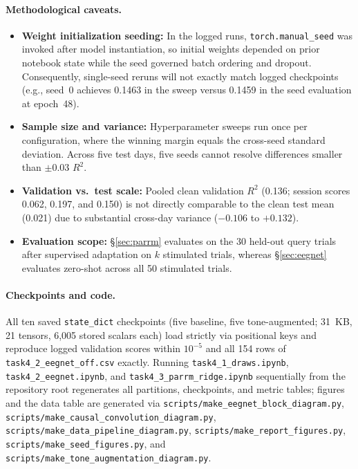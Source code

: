 \documentclass{article}
\begin{document}
\paragraph{Methodological caveats.}
\begin{itemize}\itemsep2pt
\item \textbf{Weight initialization seeding:} In the logged runs, \texttt{torch.manual\_seed} was invoked after model instantiation, so initial weights depended on prior notebook state while the seed governed batch ordering and dropout. Consequently, single-seed reruns will not exactly match logged checkpoints (e.g., seed~0 achieves 0.1463 in the sweep versus 0.1459 in the seed evaluation at epoch~48).
\item \textbf{Sample size and variance:} Hyperparameter sweeps run once per configuration, where the winning margin equals the cross-seed standard deviation. Across five test days, five seeds cannot resolve differences smaller than $\pm 0.03$ $R^2$.
\item \textbf{Validation vs.\ test scale:} Pooled clean validation $R^2$ (0.136; session scores 0.062, 0.197, and 0.150) is not directly comparable to the clean test mean (0.021) due to substantial cross-day variance ($-0.106$ to $+0.132$).
\item \textbf{Evaluation scope:} \S\ref{sec:parrm} evaluates on the 30 held-out query trials after supervised adaptation on $k$ stimulated trials, whereas \S\ref{sec:eegnet} evaluates zero-shot across all 50 stimulated trials.
\end{itemize}

\begingroup
\raggedright
\paragraph{Checkpoints and code.}
All ten saved \texttt{state\_dict} checkpoints (five baseline, five tone-augmented; 31~KB, 21 tensors, 6{,}005 stored scalars each) load strictly via positional keys and reproduce logged validation scores within $10^{-5}$ and all 154 rows of \texttt{task4\_2\_eegnet\_off.csv} exactly. Running \texttt{task4\_1\_draws.ipynb}, \texttt{task4\_2\_eegnet.ipynb}, and \texttt{task4\_3\_parrm\_ridge.ipynb} sequentially from the repository root regenerates all partitions, checkpoints, and metric tables; figures and the data table are generated via \texttt{scripts/make\_eegnet\_block\_diagram.py}, \texttt{scripts/make\_causal\_convolution\_diagram.py}, \texttt{scripts/make\_data\_pipeline\_diagram.py}, \texttt{scripts/make\_report\_figures.py}, \texttt{scripts/make\_seed\_figures.py}, and \texttt{scripts/make\_tone\_augmentation\_diagram.py}.
\par\endgroup
\end{document}
